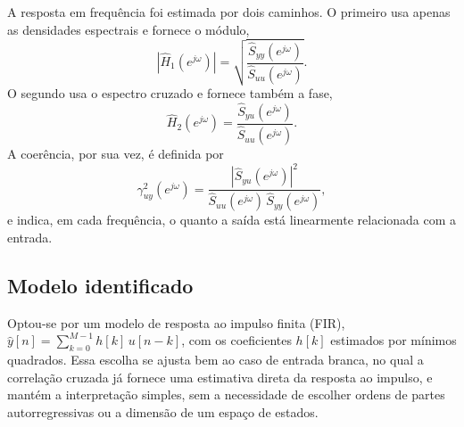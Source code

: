 A resposta em frequência foi estimada por dois caminhos. O primeiro usa apenas as
densidades espectrais e fornece o módulo,
\begin{equation}
|\hat{H}_1(e^{j\omega})| = \sqrt{\frac{\hat{S}_{yy}(e^{j\omega})}{\hat{S}_{uu}(e^{j\omega})}} .
\end{equation}
O segundo usa o espectro cruzado e fornece também a fase,
\begin{equation}
\hat{H}_2(e^{j\omega}) = \frac{\hat{S}_{yu}(e^{j\omega})}{\hat{S}_{uu}(e^{j\omega})} .
\end{equation}
A coerência, por sua vez, é definida por
\begin{equation}
\gamma^2_{uy}(e^{j\omega}) = \frac{|\hat{S}_{yu}(e^{j\omega})|^2}{\hat{S}_{uu}(e^{j\omega})\,\hat{S}_{yy}(e^{j\omega})} ,
\end{equation}
e indica, em cada frequência, o quanto a saída está linearmente relacionada com a
entrada.

\subsection{Modelo identificado}

Optou-se por um modelo de resposta ao impulso finita (FIR),
$\hat{y}[n] = \sum_{k=0}^{M-1} h[k]\,u[n-k]$, com os coeficientes $h[k]$ estimados por
mínimos quadrados. Essa escolha se ajusta bem ao caso de entrada branca, no qual a
correlação cruzada já fornece uma estimativa direta da resposta ao impulso, e mantém
a interpretação simples, sem a necessidade de escolher ordens de partes
autorregressivas ou a dimensão de um espaço de estados.
